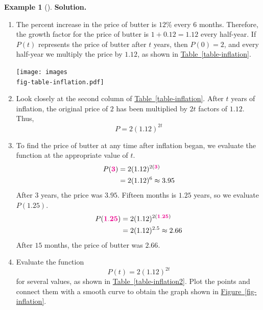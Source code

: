 \documentclass[10pt,]{book}
\theoremstyle{plain}
\theoremstyle{definition}
\theoremstyle{definition}
\theoremstyle{definition}
\newtheorem{example}[theorem]{Example}
\theoremstyle{definition}
\theoremstyle{definition}
\numberwithin{equation}{section}
\newcommand{\alert}[1]{\mathbf{\color{magenta}{#1}}}
\newcommand{\amp}{ & }
\begin{document}
\begin{example}[]
%
\par\medskip\noindent%
\textbf{Solution.}\quad \leavevmode%
\begin{enumerate}[label=*\alph**]
\item\hypertarget{li-619}{}The percent increase in the price of butter is \(12\)\% every \(6\) months. Therefore, the growth factor for the price of butter is \(1 + 0.12 = 1.12\) every half-year. If \(P(t)\) represents the price of butter after \(t\) years, then \(P(0) = 2\), and every half-year we multiply the price by \(1.12\), as shown in \hyperref[table-inflation]{Table~\ref{table-inflation}}.
        \leavevmode%
\begin{table}
\centering
\texttt{[image: images\\fig-table-inflation.pdf]}\caption{\label{table-inflation}}
\end{table}
\item\hypertarget{li-620}{}Look closely at the second column of \hyperref[table-inflation]{Table~\ref{table-inflation}}. After \(t\) years of inflation, the original price of \textdollar{}\(2\) has been multiplied by \(2t\) factors of \(1.12\). Thus,
        \begin{equation*}P = 2(1.12)^{2t}\end{equation*}\item\hypertarget{li-621}{}To find the price of butter at any time after inflation began, we evaluate the function at the appropriate value of \(t\).
        \begin{align*}
        P(\alert{3}) \amp = 2(1.12)^{2(\alert{3})} \\
        \amp = 2(1.12)^6 \approx 3.95
        \end{align*}
        After \(3\) years, the price was \textdollar{}\(3.95\). Fifteen months is \(1.25\) years, so we evaluate \(P(1.25)\).
        \begin{align*}
        P(\alert{1.25}) \amp = 2(1.12)^{2(\alert{1.25})} \\
        \amp = 2(1.12)^{2.5} \approx 2.66 
        \end{align*}
        After \(15\) months, the price of butter was \textdollar{}\(2.66\).
        \item\hypertarget{li-622}{}Evaluate the function
            \begin{equation*}P(t) = 2(1.12)^{2t}\end{equation*}
            for several values, as shown in \hyperref[table-inflation2]{Table~\ref{table-inflation2}}. Plot the points and connect them with a smooth curve to obtain the graph shown in \hyperref[fig-inflation]{Figure~\ref{fig-inflation}}.

\end{enumerate}
\end{example}
\end{document}
